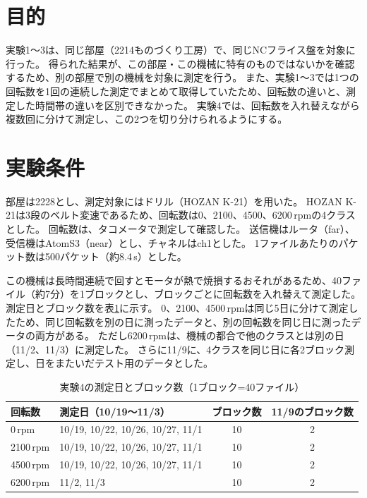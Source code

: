 \documentclass[uplatex, 12pt]{ujbook}
\begin{document}
\section{目的}
実験1〜3は、同じ部屋（2214ものづくり工房）で、同じNCフライス盤を対象に行った。
得られた結果が、この部屋・この機械に特有のものではないかを確認するため、別の部屋で別の機械を対象に測定を行う。
また、実験1〜3では1つの回転数を1回の連続した測定でまとめて取得していたため、回転数の違いと、測定した時間帯の違いを区別できなかった。
実験4では、回転数を入れ替えながら複数回に分けて測定し、この2つを切り分けられるようにする。

\section{実験条件}
部屋は2228とし、測定対象にはドリル（HOZAN K-21）を用いた。
HOZAN K-21は3段のベルト変速であるため、回転数は0、2100、4500、6200\,rpmの4クラスとした。
回転数は、タコメータで測定して確認した。
送信機はルータ（far）、受信機はAtomS3（near）とし、チャネルはch1とした。
1ファイルあたりのパケット数は500パケット（約8.4\,s）とした。

この機械は長時間連続で回すとモータが熱で焼損するおそれがあるため、40ファイル（約7分）を1ブロックとし、ブロックごとに回転数を入れ替えて測定した。
測定日とブロック数を表\ref{tab:exp4}に示す。
0、2100、4500\,rpmは同じ5日に分けて測定したため、同じ回転数を別の日に測ったデータと、別の回転数を同じ日に測ったデータの両方がある。
ただし6200\,rpmは、機械の都合で他のクラスとは別の日（11/2、11/3）に測定した。
さらに11/9に、4クラスを同じ日に各2ブロック測定し、日をまたいだテスト用のデータとした。
\begin{table}[htbp]
  \centering
  \caption{実験4の測定日とブロック数（1ブロック=40ファイル）}
  \label{tab:exp4}
  \begin{tabular}{l l c c}
    \toprule
    回転数 & 測定日（10/19〜11/3） & ブロック数 & 11/9のブロック数 \\
    \midrule
    0\,rpm    & 10/19, 10/22, 10/26, 10/27, 11/1 & 10 & 2 \\
    2100\,rpm & 10/19, 10/22, 10/26, 10/27, 11/1 & 10 & 2 \\
    4500\,rpm & 10/19, 10/22, 10/26, 10/27, 11/1 & 10 & 2 \\
    6200\,rpm & 11/2, 11/3 & 10 & 2 \\
    \bottomrule
  \end{tabular}
\end{table}
\end{document}

